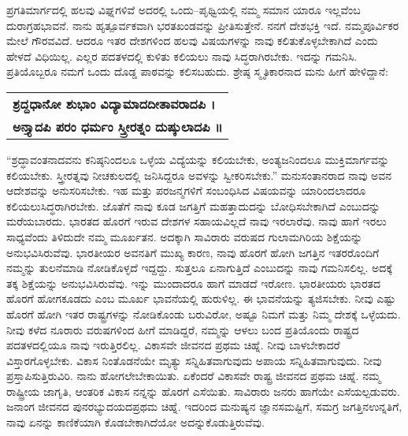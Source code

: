 ಪ್ರಗತಿಮಾರ್ಗದಲ್ಲಿ ಹಲವು ವಿಘ್ನಗಳಿವೆ ಅದರಲ್ಲಿ ಒಂದು–ಪೃಥ್ವಿಯಲ್ಲಿ ನಮ್ಮ ಸಮಾನ ಯಾರೂ ಇಲ್ಲವೆಂಬ ದುರಾಗ್ರಹಭಾವನೆ. ನಾನು ಹೃತ್ಪೂರ್ವಕವಾಗಿ ಭರತಖಂಡವನ್ನು ಪ್ರೀತಿಸುತ್ತೇನೆ. ನನಗೆ ದೇಶಭಕ್ತಿ ಇದೆ. ನಮ್ಮ\break ಪೂರ್ವಿಕರ ಮೇಲೆ ಗೌರವವಿದೆ. ಆದರೂ ಇತರ ದೇಶಗಳಿಂದ ಹಲವು ವಿಷಯಗಳನ್ನು ನಾವು ಕಲಿತುಕೊಳ್ಳಬೇಕಾಗಿದೆ ಎಂದು ಹೇಳದೆ ವಿಧಿಯಿಲ್ಲ. ಎಲ್ಲರ ಪದತಳದಲ್ಲಿ ಕುಳಿತು ಕಲಿಯಲು ನಾವು ಸಿದ್ಧರಾಗಿರಬೇಕು. ಇದನ್ನು ಗಮನಿಸಿ. ಪ್ರತಿಯೊಬ್ಬರೂ ನಮಗೆ ಒಂದು ದೊಡ್ಡ ಪಾಠವನ್ನು ಕಲಿಸಬಹುದು. ಶ್ರೇಷ್ಠ ಸ್ಮೃತಿಕಾರನಾದ ಮನು ಹೀಗೆ ಹೇಳಿದ್ದಾನೆ:

\begin{longtable}{@{}l@{}}
\textbf{ಶ್ರದ್ದಧಾನೋ ಶುಭಾಂ ವಿದ್ಯಾಮಾದದೀತಾವರಾದಪಿ ।} \\
\textbf{ಅನ್ತ್ಯಾದಪಿ ಪರಂ ಧರ್ಮಂ ಸ್ತ್ರೀರತ್ನಂ ದುಷ್ಕುಲಾದಪಿ ॥} \\
\end{longtable}

“ಶ್ರದ್ಧಾವಂತನಾದವನು ಕನಿಷ್ಠನಿಂದಲೂ ಒಳ್ಳೆಯ ವಿದ್ಯೆಯನ್ನು ಕಲಿಯಬೇಕು, ಅಂತ್ಯಜನಿಂದಲೂ ಮುಕ್ತಿಮಾರ್ಗವನ್ನು ಕಲಿಯಬೇಕು. ಸ್ತ್ರೀರತ್ನವು ನೀಚಕುಲದಲ್ಲಿ ಜನಿಸಿದ್ದರೂ ಅವಳನ್ನು ಸ್ವೀಕರಿಸಬೇಕು.” ಮನುಸಂತಾನರಾದ ನಾವು ಅವನ ಆದೇಶವನ್ನು ಅನುಸರಿಸಬೇಕು. ಇಹ ಮತ್ತು ಪರ\break ಜನ್ಮಗಳಿಗೆ ಸಂಬಂಧಿಸಿದ ವಿಷಯವನ್ನು ಯಾರಿಂದಲಾದರೂ ಕಲಿಯಲು\break ಸಿದ್ಧರಾಗಿರಬೇಕು. ಜೊತೆಗೆ ನಾವು ಕೂಡ ಜಗತ್ತಿಗೆ ಮಹತ್ತಾದುದನ್ನು ಬೋಧಿಸಬೇಕಾಗಿದೆ ಎಂಬುದನ್ನು ಮರೆಯಬಾರದು. ಭಾರತದ ಹೊರಗೆ ಇರುವ ದೇಶಗಳ ಸಹಾಯವಿಲ್ಲದೆ ನಾವು ಇರಲಾರೆವು. ನಾವು ಹಾಗೆ ಇರಲು ಸಾಧ್ಯವೆಂದು ತಿಳಿದುದೇ ನಮ್ಮ ಮೂರ್ಖತನ. ಅದಕ್ಕಾಗಿ ಸಾವಿರಾರು ವರುಷದ ಗುಲಾಮಗಿರಿಯ ಶಿಕ್ಷೆಯನ್ನು ಅನುಭವಿಸಿರುವೆವು. ಭಾರತೀಯರ ಅವನತಿಗೆ ಮುಖ್ಯ ಕಾರಣ, ನಾವು ಹೊರಗೆ ಹೋಗಿ ಜಗತ್ತಿನ ಇತರರೊಂದಿಗೆ ನಮ್ಮನ್ನು ತುಲನೆಮಾಡಿ ನೋಡಿಕೊಳ್ಳದೆ ಇದ್ದದ್ದು. ಸುತ್ತಲೂ ಏನಾಗುತ್ತಿದೆ ಎಂಬುದನ್ನು ನಾವು ಗಮನಿಸಲಿಲ್ಲ. ಅದಕ್ಕೆ ತಕ್ಕ ಶಿಕ್ಷೆಯನ್ನು ಅನುಭವಿಸಿರುವೆವು. ಇನ್ನು ಮುಂದಾದರೂ ಹಾಗೆ ಮಾಡದೆ ಇರೋಣ. ಭಾರತೀಯರು ಭಾರತದ ಹೊರಗೆ ಹೋಗಕೂಡದು ಎಂಬ ಮೂರ್ಖ ಭಾವನೆಯಲ್ಲಿ ಹುರುಳಿಲ್ಲ. ಈ ಭಾವನೆಯನ್ನು ತ್ಯಜಿಸಬೇಕು. ನೀವು ಎಷ್ಟು ಹೊರಗೆ ಹೋಗಿ ಇತರ ರಾಷ್ಟ್ರಗಳನ್ನು ನೋಡಿಕೊಂಡು ಬರುವಿರೋ, ಅಷ್ಟೂ ನಿಮಗೆ ಮತ್ತು ನಿಮ್ಮ ದೇಶಕ್ಕೆ ಒಳ್ಳೆಯದು. ನೀವು ಕಳೆದ ನೂರಾರು ವರುಷಗಳಿಂದ ಹೀಗೆ ಮಾಡಿದ್ದರೆ, ನಮ್ಮನ್ನು ಆಳಲು ಬಂದ ಪ್ರತಿಯೊಂದು ರಾಷ್ಟ್ರದ ಪದತಳದಲ್ಲಿಯೂ ನಾವು ಇರುತ್ತಿರಲಿಲ್ಲ. ವಿಕಾಸವೇ ಜೀವನದ ಪ್ರಥಮ ಚಿಹ್ನೆ. ನೀವು ಬಾಳಬೇಕಾದರೆ ವಿಸ್ತಾರಗೊಳ್ಳಬೇಕು. ವಿಕಾಸ ನಿಂತೊಡನೆಯೇ ಮೃತ್ಯು ಸನ್ನಿಹಿತವಾಗುವುದು ಅಪಾಯ ಸನ್ನಿಹಿತವಾಗುವುದು. ನೀವು ಪ್ರಸ್ತಾಪಿಸುತ್ತಿರುವಿರಿ. ನಾನು ಹೋಗಲೇ\-ಬೇಕಾಯಿತು. ಏಕೆಂದರೆ ವಿಕಾಸವೇ ರಾಷ್ಟ್ರ ಜೀವನದ ಪ್ರಥಮ ಚಿಹ್ನೆ. ನಮ್ಮ ರಾಷ್ಟ್ರೀಯ ಜಾಗೃತಿ, ಆಂತರಿಕ ವಿಕಾಸ ನನ್ನನ್ನು ಹೊರಗೆ ಎಸೆಯಿತು. ಸಾವಿರಾರು ಜನರು ಹಾಗೆಯೇ ಎಸೆಯಲ್ಪಡುವರು. ಜನಾಂಗ ಜೀವನದ ಪುನರಭ್ಯುದಯದ\break ಪ್ರಥಮ ಚಿಹ್ನೆ. ಇದರಿಂದ ಮನುಷ್ಯನ ಜ್ಞಾನಸಮಷ್ಟಿಗೆ, ಸಮಗ್ರ ಜಗತ್ತಿನ\break ಉನ್ನತಿಗೆ, ನಾವು ಏನನ್ನು ಕಾಣಿಕೆಯಾಗಿ ಕೊಡಬೇಕಾಗಿದೆಯೋ ಅದನ್ನು\break ಕೊಡುತ್ತಿರುವೆವು.

